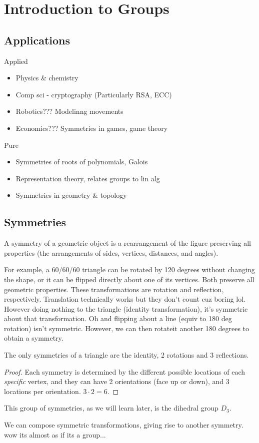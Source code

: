 \chapter{Introduction to Groups}
\section{Applications}
Applied
\begin{itemize}
	\item Physics \& chemistry
	\item Comp sci - cryptography (Particularly RSA, ECC)
	\item Robotics??? Modelinng movements
	\item Economics??? Symmetries in games, game theory
\end{itemize}
Pure
\begin{itemize}
	\item Symmetries of roots of polynomials, Galois
	\item Representation theory, relates groups to lin alg
	\item Symmetries in geometry \& topology
\end{itemize}
\section{Symmetries}
\begin{definition}[Symmetry]\label{dfn:1}
	A symmetry of a geometric object is a rearrangement of the figure preserving all properties (the arrangements of sides, vertices, distances, and angles).
\end{definition}
For example, a 60/60/60 triangle can be rotated by 120 degrees without changing the shape, or it can be flipped directly about one of its vertices. Both preserve all geometric properties. These transformations are rotation and reflection, respectively. Translation technically works but they don't count cuz boring lol. However doing nothing to the triangle (identity transformation), it's symmetric about that transformation. Oh and flipping about a line (equiv to 180 deg rotation) isn't symmetric. However, we can then rotateit another 180 degrees to obtain a symmetry.

\begin{claim}\label{thm:1}
	The only symmetries of a triangle are the identity, 2 rotations and 3 reflections.
\end{claim}
\begin{proof}
	Each symmetry is determined by the different possible locations of each \emph{specific} vertex, and they can have 2 orientations (face up or down), and 3 locations per orientation. $3\cdot 2=6$.
\end{proof}
\begin{remark}
	This group of symmetries, as we will learn later, is the dihedral group $D_3$.
\end{remark}
We can compose symmetric transformations, giving rise to another symmetry. wow its almost as if its a group...

